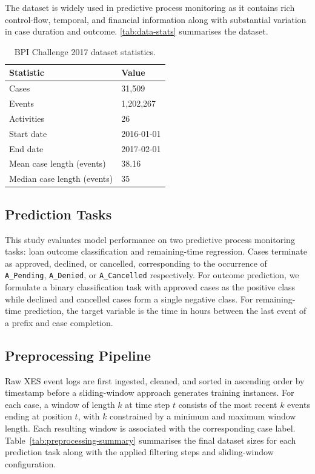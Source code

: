 \documentclass[runningheads]{llncs}
\begin{document}
The dataset is widely used in predictive process monitoring as it contains rich control-flow, temporal, and financial information along with substantial variation in case duration and outcome. \autoref{tab:data-stats} summarises the dataset.

\begin{table}[H]
    \centering
    \caption{BPI Challenge 2017 dataset statistics.}
    \label{tab:data-stats}
    \begin{tabularx}{0.6\textwidth}{lX}
        \toprule
        Statistic & Value \\
        \midrule
        Cases & 31,509 \\
        Events & 1,202,267 \\
        Activities & 26 \\
        Start date & 2016-01-01 \\
        End date & 2017-02-01 \\
        Mean case length (events) & 38.16 \\
        Median case length (events) & 35 \\
        \bottomrule
    \end{tabularx}
\end{table}

\subsection{Prediction Tasks}
This study evaluates model performance on two predictive process monitoring tasks: loan outcome classification and remaining-time regression. Cases terminate as approved, declined, or cancelled, corresponding to the
occurrence of \texttt{A\_Pending}, \texttt{A\_Denied}, or
\texttt{A\_Cancelled} respectively. For outcome prediction, we formulate a binary classification task with approved cases as the positive class while declined and cancelled cases form a single negative class. For remaining-time prediction, the target variable is the time in hours between the last event of a prefix and case completion.

\subsection{Preprocessing Pipeline}
\label{sec:preprocessing}

Raw XES event logs are first ingested, cleaned, and sorted in ascending order by timestamp before a sliding-window approach generates training instances. For each case, a window of length $k$ at time step $t$ consists of the most recent $k$ events ending at position $t$, with $k$ constrained by a minimum and maximum window length. Each resulting window is associated with the corresponding case label. Table~\ref{tab:preprocessing-summary} summarises the final dataset sizes for each prediction task along with the applied filtering steps and sliding-window configuration. 
\end{document}

